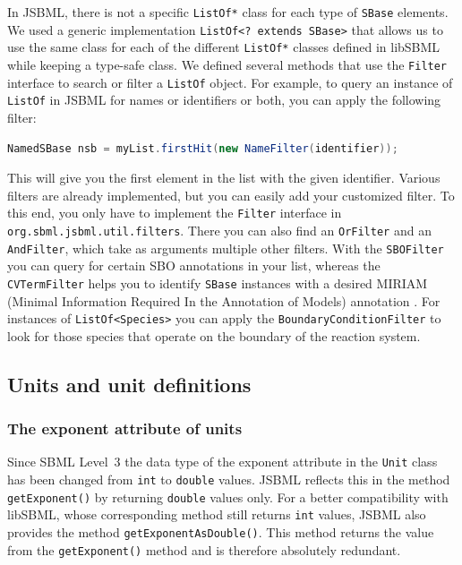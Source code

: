In JSBML, there is not a specific
\texttt{ListOf*} class for each type of
\texttt{SBase} elements. We used a generic
implementation \texttt{ListOf<?~extends SBase>} that allows us to use the same
class for each of the different \texttt{ListOf*} classes defined in libSBML
while keeping a type-safe class. We defined several methods that use the
\texttt{Filter} interface to search or filter a \texttt{ListOf} object. For
example, to query an instance of \texttt{ListOf} in JSBML for names or
identifiers or both, you can apply the following filter:
\begin{lstlisting}[language=Java,numbers=none]
NamedSBase nsb = myList.firstHit(new NameFilter(identifier));
\end{lstlisting}
This will give you the first element in the list with the given identifier.
Various filters are already implemented, but you can easily add your
customized filter. To this end, you only have to implement the \texttt{Filter}
%
interface in \texttt{org.sbml.jsbml.util.filters}.
%
There you can also find an \texttt{OrFilter} and an \texttt{AndFilter}, which
take as arguments multiple other filters. With the \texttt{SBOFilter} you can
query for certain SBO  annotations \citep{Novere2006,Novere2006b}
%
in your list, whereas the \texttt{CVTermFilter} helps you to identify
\texttt{SBase}
%
instances with a desired MIRIAM (Minimal Information Required In the Annotation
of Models) annotation \citep{Novere2005}. For instances of
\texttt{ListOf<Species>} you can apply the \texttt{BoundaryConditionFilter} to
look for those species that operate on the
boundary of the reaction system.


\subsection{Units and unit definitions}
\subsubsection{The exponent attribute of units}

Since SBML Level~3 \citep{Hucka2010a} the data type of the
exponent attribute in the \texttt{Unit} class has been changed from \texttt{int}
to \texttt{double} values. JSBML
%
%
%
reflects this in the method \texttt{getExponent()} by returning \texttt{double}
values only. For a better compatibility with libSBML, whose corresponding method
still returns \texttt{int} values, JSBML also provides the method
\texttt{getExponentAsDouble()}. This method returns the value from the
\texttt{getExponent()} method and is therefore absolutely redundant.


